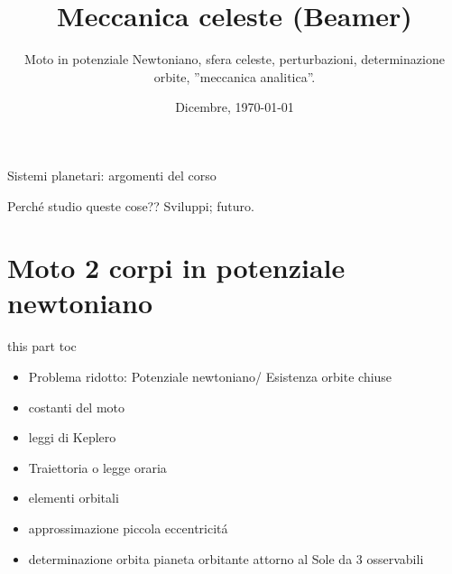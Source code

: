 \documentclass[10pt,xcolor={usenames},fleqn,mathserif,serif]{beamer}
\title{Meccanica celeste (Beamer)}
\subtitle{Moto in potenziale Newtoniano, sfera celeste, perturbazioni, determinazione orbite, ''meccanica analitica''.}
\date{Dicembre, \today}
\begin{document}



\begin{frame}
  \titlepage
\end{frame}


\begin{frame}[label={argomenti}]{Sistemi planetari: argomenti del corso}

\tableofcontents[onlyparts]


\end{frame}

\begin{wordonframe}{Perch\'e studio queste cose?? Sviluppi; futuro.}


\end{wordonframe}


\part{Moto 2 corpi in potenziale newtoniano}\label{part:kepler}
\frame{\partpage}

\begin{frame}{this part toc}

\begin{itemize}

\item Problema ridotto: Potenziale newtoniano/ Esistenza orbite chiuse
\item costanti del moto
\item leggi di Keplero
\item Traiettoria o legge oraria
\item elementi orbitali
\item approssimazione piccola eccentricit\'a
\item determinazione orbita pianeta orbitante attorno al Sole da 3 osservabili

\end{itemize}

\end{frame}
\end{document}
